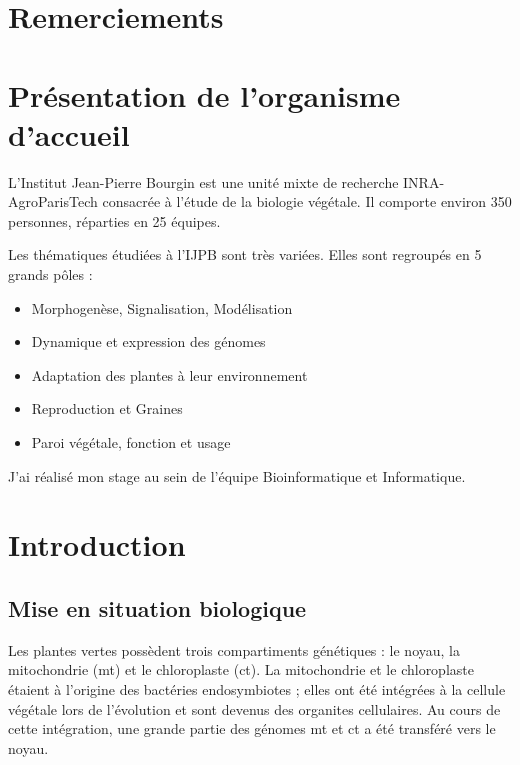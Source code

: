 \documentclass[a4paper]{article}
\begin{document}
\section*{Remerciements}

\newpage

\renewcommand{\contentsname}{Table des matières} 

\tableofcontents

\newpage

\section{Présentation de l'organisme d'accueil}

L'Institut Jean-Pierre Bourgin est une unité mixte de recherche INRA-AgroParisTech consacrée à l'étude de la biologie végétale. Il comporte environ 350 personnes, réparties en 25 équipes.

Les thématiques étudiées à l'IJPB sont très variées. Elles sont regroupés en 5 grands pôles : 
\begin{itemize}
\item Morphogenèse, Signalisation, Modélisation 
\item Dynamique et expression des génomes 
\item Adaptation des plantes à leur environnement 
\item Reproduction et Graines 
\item Paroi végétale, fonction et usage
\end{itemize}

J'ai réalisé mon stage au sein de l'équipe Bioinformatique et Informatique. 


\section{Introduction}

\subsection{Mise en situation biologique}

Les plantes vertes possèdent trois compartiments génétiques : le noyau, la mitochondrie (mt) et le chloroplaste (ct). La mitochondrie et le chloroplaste étaient à l'origine des bactéries endosymbiotes ; elles ont été intégrées à la cellule végétale lors de l'évolution et sont devenus des organites cellulaires. Au cours de cette intégration, une grande partie des génomes mt et ct a été transféré vers le noyau. 
\end{document}
